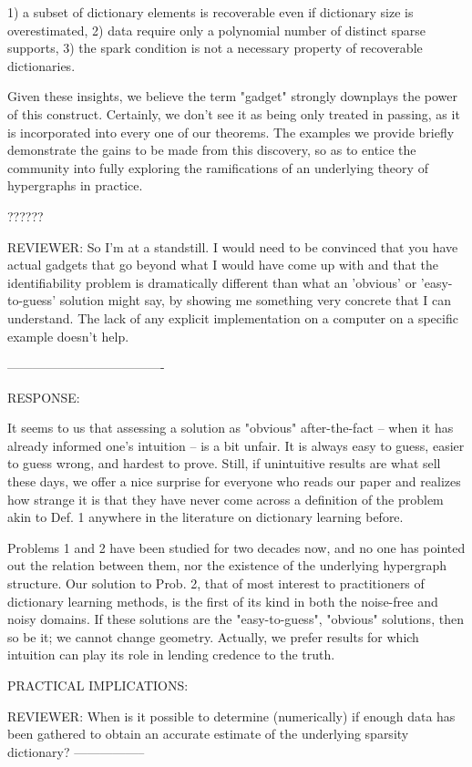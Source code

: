 1) a subset of dictionary elements is recoverable even if dictionary size is overestimated,
2) data require only a polynomial number of distinct sparse supports,
3) the spark condition is not a necessary property of recoverable dictionaries.

Given these insights, we believe the term "gadget" strongly downplays the power of this construct. Certainly, we don't see it as being only treated in passing, as it is incorporated into every one of our theorems. The examples we provide briefly demonstrate the gains to be made from this discovery, so as to entice the community into fully exploring the ramifications of an underlying theory of hypergraphs in practice. 

??????

REVIEWER: So I'm at a standstill. I would need to be convinced that you have actual
gadgets that go beyond what I would have come up with and that the
identifiability problem is dramatically different than what an 'obvious' or
'easy-to-guess' solution might say, by showing me something very concrete
that I can understand. The lack of any explicit implementation on a
computer on a specific example doesn't help.

-------------------------------------

RESPONSE:

It seems to us that assessing a solution as "obvious" after-the-fact -- when it has already informed one's intuition -- is a bit unfair. It is always easy to guess, easier to guess wrong, and hardest to prove. Still, if unintuitive results are what sell these days, we offer a nice surprise for everyone who reads our paper and realizes how strange it is that they have never come across a definition of the problem akin to Def. 1 anywhere in the literature on dictionary learning before.

Problems 1 and 2 have been studied for two decades now, and no one has pointed out the relation between them, nor the existence of the underlying hypergraph structure. Our solution to Prob. 2, that of most interest to practitioners of dictionary learning methods, is the first of its kind in both the noise-free and noisy domains. If these solutions are the "easy-to-guess", "obvious" solutions, then so be it; we cannot change geometry. Actually, we prefer results for which intuition can play its role in lending credence to the truth.


PRACTICAL IMPLICATIONS:

REVIEWER: When is it possible to determine (numerically) if enough data has been gathered to obtain an accurate estimate of the underlying sparsity dictionary?
-----------------

